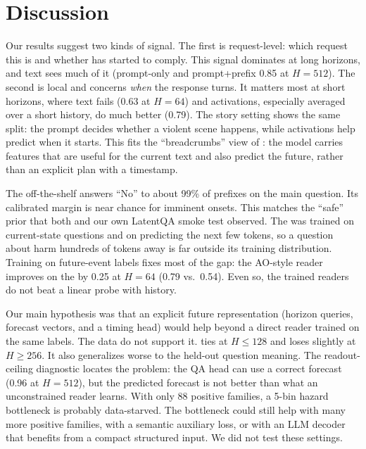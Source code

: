 \section{Discussion}
\label{sec:discussion}

Our results suggest two kinds of signal. The first is request-level: which request this is and whether \qwen has started to comply. This signal dominates at long horizons, and text sees much of it (prompt-only  and prompt+prefix 0.85 at $H{=}512$). The second is local and concerns \emph{when} the response turns. It matters most at short horizons, where text fails (0.63 at $H{=}64$) and activations, especially averaged over a short history, do much better (0.79). The story setting shows the same split: the prompt decides whether a violent scene happens, while activations help predict when it starts. This fits the ``breadcrumbs'' view of \citet{wu2024planahead}: the model carries features that are useful for the current text and also predict the future, rather than an explicit plan with a timestamp.

The off-the-shelf \ao answers ``No'' to about 99\% of prefixes on the main question. Its calibrated margin is near chance for imminent onsets. This matches the ``safe'' prior that both \citet{bauer2026building} and our own LatentQA smoke test observed. The \ao was trained on current-state questions and on predicting the next few tokens, so a question about harm hundreds of tokens away is far outside its training distribution. Training on future-event labels fixes most of the gap: the AO-style \direct reader improves on the \ao by 0.25 \auroc at $H{=}64$ (0.79 vs.\ 0.54). Even so, the trained readers do not beat a linear probe with history.

Our main hypothesis was that an explicit future representation (horizon queries, forecast vectors, and a timing head) would help beyond a direct reader trained on the same labels. The data do not support it. \forecast ties \direct at $H\le128$ and loses slightly at $H\ge256$. It also generalizes worse to the held-out question meaning. The readout-ceiling diagnostic locates the problem: the QA head can use a correct forecast (0.96 at $H{=}512$), but the predicted forecast is not better than what an unconstrained reader learns. With only 88 positive families, a 5-bin hazard bottleneck is probably data-starved. The bottleneck could still help with many more positive families, with a semantic auxiliary loss, or with an LLM decoder that benefits from a compact structured input. We did not test these settings.

